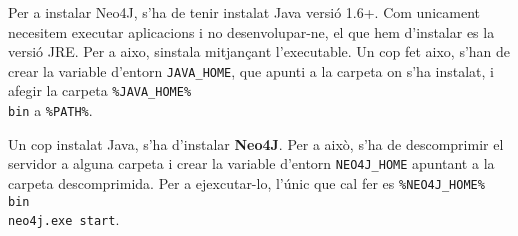 Per a instalar Neo4J, s'ha de tenir instalat Java versió 1.6+. Com unicament necesitem executar aplicacions i no desenvolupar-ne, el que hem d'instalar es la versió JRE. Per a aixo, sinstala mitjançant l'executable. Un cop fet aixo, s'han de crear la variable d'entorn {\tt JAVA\_HOME}, que apunti a la carpeta on s'ha instalat, i afegir la carpeta {\tt \%JAVA_HOME\%\\bin} a {\tt \%PATH\%}.

Un cop instalat Java, s'ha d'instalar {\bf Neo4J}. Per a això, s'ha de descomprimir el servidor a alguna carpeta i crear la variable d'entorn {\tt NEO4J\_HOME} apuntant a la carpeta descomprimida. Per a ejexcutar-lo, l'únic que cal fer es {\tt \%NEO4J\_HOME\%\\bin\\neo4j.exe start}.